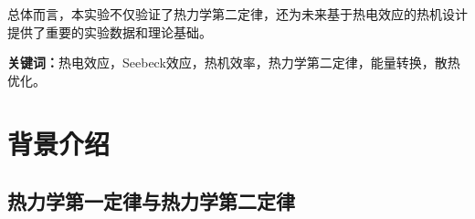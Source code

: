 \documentclass[dvipsnames, svgnames,a4paper,11pt]{article}
\begin{document}
总体而言，本实验不仅验证了热力学第二定律，还为未来基于热电效应的热机设计提供了重要的实验数据和理论基础。

\textbf{关键词：}热电效应，Seebeck效应，热机效率，热力学第二定律，能量转换，散热优化。


\clearpage
\tableofcontents
\clearpage









\section{背景介绍}

    \subsection{热力学第一定律与热力学第二定律}
        
\end{document}
